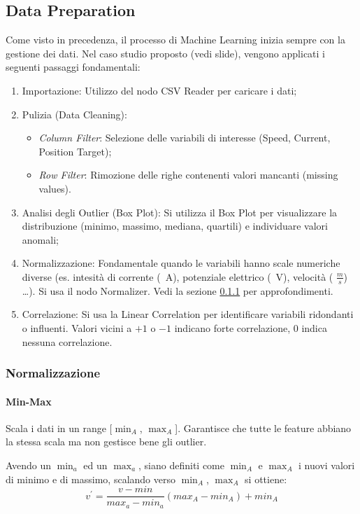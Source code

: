 \subsection{Data Preparation}
Come visto in precedenza, il processo di Machine Learning inizia sempre con la gestione dei dati. Nel caso studio proposto (vedi slide), vengono applicati i seguenti passaggi fondamentali:
\begin{enumerate}
    \item Importazione: Utilizzo del nodo CSV Reader per caricare i dati;
    \item Pulizia (Data Cleaning):
          \begin{itemize}
              \item \emph{Column Filter}: Selezione delle variabili di interesse (Speed, Current, Position Target);
              \item \emph{Row Filter}: Rimozione delle righe contenenti valori mancanti (missing values).
          \end{itemize}
    \item Analisi degli Outlier (Box Plot): Si utilizza il Box Plot per visualizzare la distribuzione (minimo, massimo, mediana, quartili) e individuare valori anomali;
    \item Normalizzazione: Fondamentale quando le variabili hanno scale numeriche diverse (es. intesità di corrente (\SI{}{\ampere}), potenziale elettrico (\SI{}{\volt}), velocità ( $\frac{m}{s} $) \dots). Si usa il nodo Normalizer. Vedi la sezione \ref{subsubsec:norm} per approfondimenti.
    \item Correlazione: Si usa la Linear Correlation per identificare variabili ridondanti o influenti. Valori vicini a $ +1 $ o $ -1 $ indicano forte correlazione, $ 0 $ indica nessuna correlazione.
\end{enumerate}

\subsubsection{Normalizzazione} \label{subsubsec:norm}
%
\paragraph{Min-Max} Scala i dati in un range [$ \min_{A} $, $ \max_{A} $]. Garantisce che tutte le feature abbiano la stessa scala ma non gestisce bene gli outlier.

Avendo un $ \min_{a} $ ed un $ \max_{a} $, siano definiti come $ \min_{A} $ e $ \max_{A} $ i nuovi valori di minimo e di massimo, scalando verso $ \min_{A} $, $ \max_{A} $ si ottiene:
\[
    v^{\prime}=\frac{v-min}{max_{a}-min_{a}}(max_{A}-min_{A})+min_{A}
\]
%
